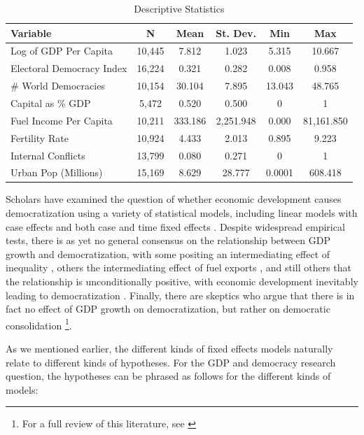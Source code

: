 \documentclass{article}[12pt]
\begin{document}
\begin{table}[!htbp] \centering 
	\begin{tabular}{@{\extracolsep{5pt}}lccccc} 
		
		Variable & \multicolumn{1}{c}{N} & \multicolumn{1}{c}{Mean} & \multicolumn{1}{c}{St. Dev.} & \multicolumn{1}{c}{Min} & \multicolumn{1}{c}{Max} \\ 
		\midrule 
		Log of GDP Per Capita & 10,445 & 7.812 & 1.023 & 5.315 & 10.667 \\ 
		Electoral Democracy Index & 16,224 & 0.321 & 0.282 & 0.008 & 0.958 \\ 
		\# World Democracies & 10,154 & 30.104 & 7.895 & 13.043 & 48.765 \\ 
		Capital as 	\% GDP & 5,472 & 0.520 & 0.500 & 0 & 1 \\ 
		Fuel Income Per Capita & 10,211 & 333.186 & 2,251.948 & 0.000 & 81,161.850 \\ 
		Fertility Rate & 10,924 & 4.433 & 2.013 & 0.895 & 9.223 \\ 
		Internal Conflicts & 13,799 & 0.080 & 0.271 & 0 & 1 \\
		Urban Pop (Millions) & 15,169 & 8.629 & 28.777 & 0.0001 & 608.418 \\
	\end{tabular} 
	\caption{Descriptive Statistics} 
	\label{describe} 
\end{table} 

Scholars have examined the question of whether economic development causes democratization using a variety of statistical models, including linear models with case effects \parencite{kennedy2010} and both case and time fixed effects \parencite{acemoglu2009,boix2011,hm2011}. Despite widespread empirical tests, there is as yet no general consensus on the relationship between GDP growth and democratization, with some positing an intermediating effect of inequality \cite{Acemoglu2006,Houle2009,Boix2003}, others the intermediating effect of fuel exports \parencite{hm2011,andersenross2014}, and still others that the relationship is unconditionally positive, with economic development inevitably leading to democratization \parencite{inglehart2005}. Finally, there are skeptics who argue that there is in fact no effect of GDP growth on democratization, but rather on democratic consolidation \parencite{Limongi1997}\footnote{For a full review of this literature, see \textcite{coppedge2012}}. 

As we mentioned earlier, the different kinds of fixed effects models naturally relate to different kinds of hypotheses. For the GDP and democracy research question, the hypotheses can be phrased as follows for the different kinds of models:
\end{document}
